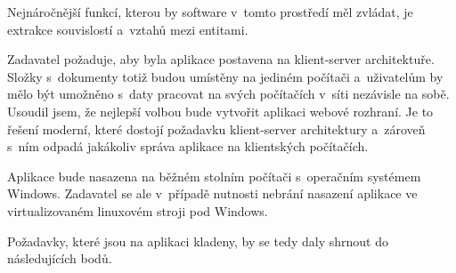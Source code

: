 Nejnáročnější funkcí, kterou by software v~tomto prostředí měl zvládat, je extrakce souvislostí a~vztahů mezi entitami.

Zadavatel požaduje, aby byla aplikace postavena na klient-server architektuře. Složky s~dokumenty totiž budou umístěny na jediném počítači a~uživatelům by mělo být umožněno s~daty pracovat na svých počítačích v~síti nezávisle na sobě. Usoudil jsem, že nejlepší volbou bude vytvořit aplikaci webové rozhraní. Je to řešení moderní, které dostojí požadavku klient-server architektury a~zároveň s~ním odpadá jakákoliv správa aplikace na klientských počítačích.

Aplikace bude nasazena na běžném stolním počítači s~operačním systémem Windows. Zadavatel se ale v~případě nutnosti nebrání nasazení aplikace ve virtualizovaném linuxovém stroji pod Windows.

Požadavky, které jsou na aplikaci kladeny, by se tedy daly shrnout do následujících bodů.

